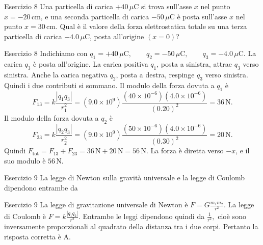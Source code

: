 \documentclass[a4paper]{article}
\begin{document}
\begin{snippetexercise}{Esercizio 8}
    Una particella di carica \(+40\,\mu\mathrm{C}\) si trova sull'asse \(x\)
    nel punto \(x = -20\,\mathrm{cm}\), e una seconda particella di carica
    \(-50\,\mu\mathrm{C}\) è posta sull'asse \(x\) nel punto
    \(x = 30\,\mathrm{cm}\). Qual è il valore della forza elettrostatica totale
    su una terza particella di carica \(-4.0\,\mu\mathrm{C}\), posta
    all'origine \((x = 0)\)?

\end{snippetexercise}
\begin{snippetsolution}{Esercizio 8}
    Indichiamo con
    \(q_1 = +40\,\mu\mathrm{C}, \qquad q_2 = -50\,\mu\mathrm{C}, \qquad q_3 = -4.0\,\mu\mathrm{C}.\)
    La carica \(q_3\) è posta all'origine. La carica positiva \(q_1\), posta a
    sinistra, attrae \(q_3\) verso sinistra. Anche la carica negativa \(q_2\),
    posta a destra, respinge \(q_3\) verso sinistra. Quindi i due contributi si
    sommano.
    Il modulo della forza dovuta a \(q_1\) è
    \[
        F_{13}
        =
        k\frac{|q_1q_3|}{r_1^2}
        =
        \left(9.0 \times 10^9\right)
        \frac{
            \left(40 \times 10^{-6}\right)
            \left(4.0 \times 10^{-6}\right)
        }{
            (0.20)^2
        }
        =
        36\,\mathrm{N}.
    \]
    Il modulo della forza dovuta a \(q_2\) è
    \[
        F_{23}
        =
        k\frac{|q_2q_3|}{r_2^2}
        =
        \left(9.0 \times 10^9\right)
        \frac{
            \left(50 \times 10^{-6}\right)
            \left(4.0 \times 10^{-6}\right)
        }{
            (0.30)^2
        }
        =
        20\,\mathrm{N}.
    \]
    Quindi
    \(F_{\mathrm{tot}} = F_{13} + F_{23} = 36\,\mathrm{N} + 20\,\mathrm{N} = 56\,\mathrm{N}.\)
    La forza è diretta verso \(-x\), e il suo modulo è
    \(\boxed{56\,\mathrm{N}}.\)
\end{snippetsolution}
\begin{snippetexercise}{Esercizio 9}
    La legge di Newton sulla gravità universale e la legge di Coulomb
    dipendono entrambe da

\end{snippetexercise}
\begin{snippetsolution}{Esercizio 9}
    La legge di gravitazione universale di Newton è
    \(F = G\frac{m_1m_2}{r^2}.\)
    La legge di Coulomb è
    \(F = k\frac{|q_1q_2|}{r^2}.\)
    Entrambe le leggi dipendono quindi da
    \(\frac{1}{r^2},\)
    cioè sono inversamente proporzionali al quadrato della distanza tra i due
    corpi.
    Pertanto la risposta corretta è
    \(\boxed{\text{A}}.\)
\end{snippetsolution}
\end{document}
